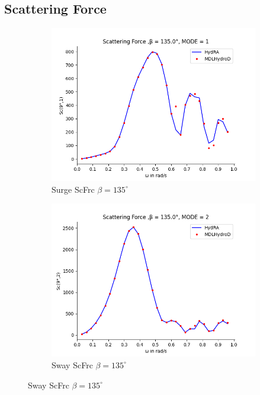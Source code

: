 \subsection{Scattering Force}
\begin{figure}[H]
    \centering
    \begin{subfigure}[b]{0.45\textwidth}
        \includegraphics[width=\textwidth]{plots/kvlcc/sc/sc1.png}
        \caption{Surge ScFrc $\beta = 135^{\circ}$}
    \end{subfigure}
    \begin{subfigure}[b]{0.45\textwidth}
        \includegraphics[width=\textwidth]{plots/kvlcc/sc/sc2.png}
        \caption{Sway ScFrc $\beta = 135^{\circ}$}
    \end{subfigure}

\end{figure}
